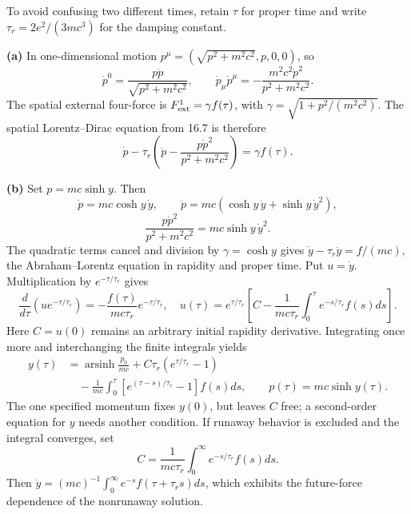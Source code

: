 To avoid confusing two different times, retain $\tau$ for proper time
and write $\tau_r=2e^2/(3mc^3)$ for the damping constant.

\textbf{(a)} In one-dimensional motion
$p^\mu=(\sqrt{p^2+m^2c^2},p,0,0)$, so
\[
\dot p^0=\frac{p\dot p}{\sqrt{p^2+m^2c^2}},\qquad
\dot p_\mu\dot p^\mu
=-\frac{m^2c^2\dot p^2}{p^2+m^2c^2}.
\]
The spatial external four-force is $F^1_{\rm ext}=\gamma f(\tau)$,
with $\gamma=\sqrt{1+p^2/(m^2c^2)}$.
The spatial Lorentz--Dirac equation from 16.7 is therefore
\[
\boxed{\dot p-\tau_r\left(\ddot p-
\frac{p\dot p^2}{p^2+m^2c^2}\right)=\gamma f(\tau).}
\]

\textbf{(b)} Set $p=mc\sinh y$. Then
\[
\dot p=mc\cosh y\,\dot y,\qquad
\ddot p=mc(\cosh y\,\ddot y+\sinh y\,\dot y^2),
\]
\[
\frac{p\dot p^2}{p^2+m^2c^2}=mc\sinh y\,\dot y^2.
\]
The quadratic terms cancel and division by $\gamma=\cosh y$ gives
$\dot y-\tau_r\ddot y=f/(mc)$, the Abraham--Lorentz equation in
rapidity and proper time.
Put $u=\dot y$. Multiplication by $e^{-\tau/\tau_r}$ gives
\[
\frac d{d\tau}(u e^{-\tau/\tau_r})
=-\frac{f(\tau)}{mc\tau_r}e^{-\tau/\tau_r},
\quad
u(\tau)=e^{\tau/\tau_r}
\left[C-\frac1{mc\tau_r}\int_0^\tau e^{-s/\tau_r}f(s)ds\right].
\]
Here $C=u(0)$ remains an arbitrary initial rapidity derivative.
Integrating once more and interchanging the finite integrals yields
\[
\begin{split}
y(\tau)&=\operatorname{arsinh}\frac{p_0}{mc}
+C\tau_r(e^{\tau/\tau_r}-1)\\
&\quad-\frac1{mc}\int_0^\tau
[e^{(\tau-s)/\tau_r}-1]f(s)ds,
\qquad \boxed{p(\tau)=mc\sinh y(\tau).}
\end{split}
\]
The one specified momentum fixes $y(0)$, but leaves $C$ free;
a second-order equation for $y$ needs another condition.
If runaway behavior is excluded and the integral converges, set
\[
C=\frac1{mc\tau_r}\int_0^\infty e^{-s/\tau_r}f(s)ds.
\]
Then $\dot y=(mc)^{-1}\int_0^\infty e^{-s}f(\tau+\tau_rs)ds$,
which exhibits the future-force dependence of the nonrunaway solution.

